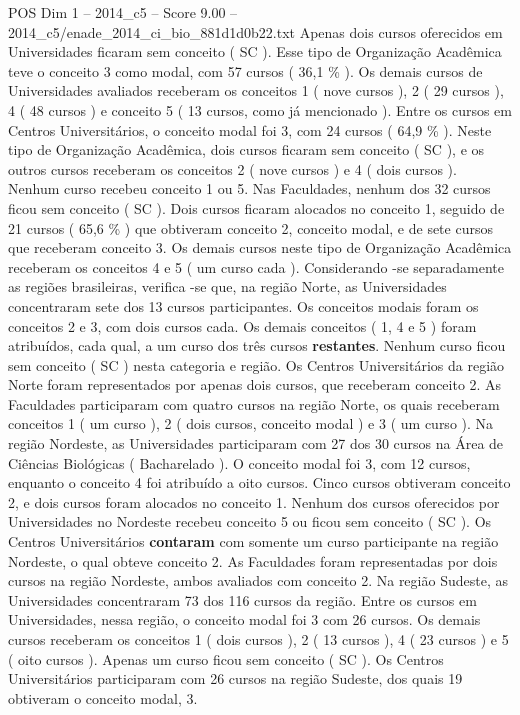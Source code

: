 \begin{textsample}{POS Dim 1 – 2014\_c5 – Score 9.00 – 2014\_c5/enade\_2014\_ci\_bio\_881d1d0b22.txt}
Apenas dois cursos oferecidos em Universidades ficaram sem conceito ( SC ).
Esse tipo de Organização Acadêmica teve o conceito 3 como modal, com 57 cursos ( 36,1 \% ).
Os demais cursos de Universidades avaliados receberam os conceitos 1 ( nove cursos ), 2 ( 29 cursos ), 4 ( 48 cursos ) e conceito 5 ( 13 cursos, como já mencionado ).
Entre os cursos em Centros Universitários, o conceito modal foi 3, com 24 cursos ( 64,9 \% ).
Neste tipo de Organização Acadêmica, dois cursos ficaram sem conceito ( SC ), e os outros cursos receberam os conceitos 2 ( nove cursos ) e 4 ( dois cursos ).
Nenhum curso recebeu conceito 1 ou 5.
Nas Faculdades, nenhum dos 32 cursos ficou sem conceito ( SC ).
Dois cursos ficaram alocados no conceito 1, seguido de 21 cursos ( 65,6 \% ) que obtiveram conceito 2, conceito modal, e de sete cursos que receberam conceito 3.
Os demais cursos neste tipo de Organização Acadêmica receberam os conceitos 4 e 5 ( um curso cada ).
Considerando -se separadamente as regiões brasileiras, verifica -se que, na região Norte, as Universidades concentraram sete dos 13 cursos participantes.
Os conceitos modais foram os conceitos 2 e 3, com dois cursos cada.
Os demais conceitos ( 1, 4 e 5 ) foram atribuídos, cada qual, a um curso dos três cursos \textbf{restantes}.
Nenhum curso ficou sem conceito ( SC ) nesta categoria e região.
Os Centros Universitários da região Norte foram representados por apenas dois cursos, que receberam conceito 2.
As Faculdades participaram com quatro cursos na região Norte, os quais receberam conceitos 1 ( um curso ), 2 ( dois cursos, conceito modal ) e 3 ( um curso ).
Na região Nordeste, as Universidades participaram com 27 dos 30 cursos na Área de Ciências Biológicas ( Bacharelado ).
O conceito modal foi 3, com 12 cursos, enquanto o conceito 4 foi atribuído a oito cursos.
Cinco cursos obtiveram conceito 2, e dois cursos foram alocados no conceito 1.
Nenhum dos cursos oferecidos por Universidades no Nordeste recebeu conceito 5 ou ficou sem conceito ( SC ).
Os Centros Universitários \textbf{contaram} com somente um curso participante na região Nordeste, o qual obteve conceito 2.
As Faculdades foram representadas por dois cursos na região Nordeste, ambos avaliados com conceito 2.
Na região Sudeste, as Universidades concentraram 73 dos 116 cursos da região.
Entre os cursos em Universidades, nessa região, o conceito modal foi 3 com 26 cursos.
Os demais cursos receberam os conceitos 1 ( dois cursos ), 2 ( 13 cursos ), 4 ( 23 cursos ) e 5 ( oito cursos ).
Apenas um curso ficou sem conceito ( SC ).
Os Centros Universitários participaram com 26 cursos na região Sudeste, dos quais 19 obtiveram o conceito modal, 3.

\end{textsample}
